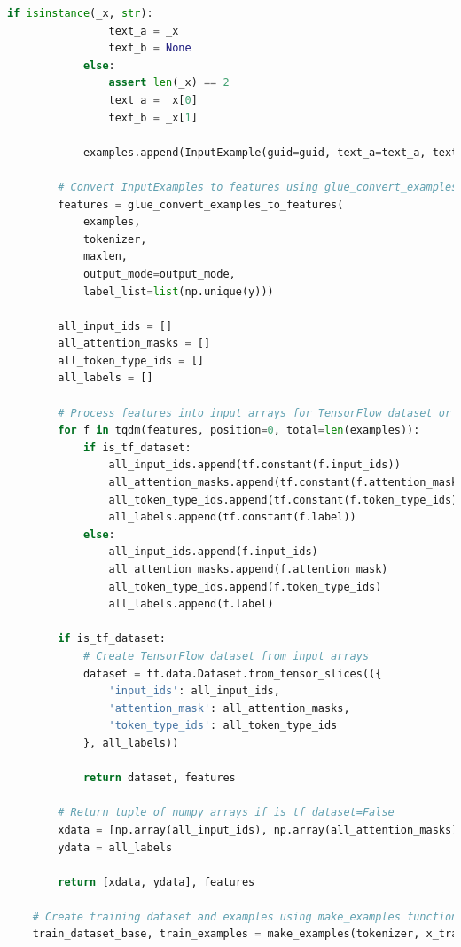 \documentclass{solutionclass} %
\begin{document}
\begin{solution}
\begin{lstlisting}[language=Python, basicstyle=\ttfamily\footnotesize, keywordstyle=\color{blue}, commentstyle=\color{gray}]
            if isinstance(_x, str):
                text_a = _x
                text_b = None
            else:
                assert len(_x) == 2
                text_a = _x[0]
                text_b = _x[1]
    
            examples.append(InputExample(guid=guid, text_a=text_a, text_b=text_b, label=label))
    
        # Convert InputExamples to features using glue_convert_examples_to_features function
        features = glue_convert_examples_to_features(
            examples,
            tokenizer,
            maxlen,
            output_mode=output_mode,
            label_list=list(np.unique(y)))
    
        all_input_ids = []
        all_attention_masks = []
        all_token_type_ids = []
        all_labels = []
    
        # Process features into input arrays for TensorFlow dataset or numpy arrays
        for f in tqdm(features, position=0, total=len(examples)):
            if is_tf_dataset:
                all_input_ids.append(tf.constant(f.input_ids))
                all_attention_masks.append(tf.constant(f.attention_mask))
                all_token_type_ids.append(tf.constant(f.token_type_ids))
                all_labels.append(tf.constant(f.label))
            else:
                all_input_ids.append(f.input_ids)
                all_attention_masks.append(f.attention_mask)
                all_token_type_ids.append(f.token_type_ids)
                all_labels.append(f.label)
    
        if is_tf_dataset:
            # Create TensorFlow dataset from input arrays
            dataset = tf.data.Dataset.from_tensor_slices(({
                'input_ids': all_input_ids,
                'attention_mask': all_attention_masks,
                'token_type_ids': all_token_type_ids
            }, all_labels))
    
            return dataset, features
    
        # Return tuple of numpy arrays if is_tf_dataset=False
        xdata = [np.array(all_input_ids), np.array(all_attention_masks), np.array(all_token_type_ids)]
        ydata = all_labels
    
        return [xdata, ydata], features
    
    # Create training dataset and examples using make_examples function
    train_dataset_base, train_examples = make_examples(tokenizer, x_train, y_train, maxlen=128)
    

\end{lstlisting}
\end{solution}
\end{document}
